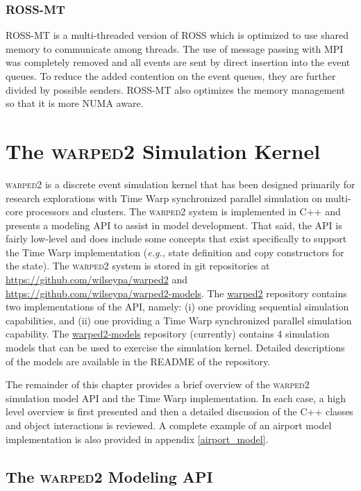 \documentclass[11pt]{book}
\begin{document}
\subsection{ROSS-MT}

ROSS-MT \cite{jagtap-12} is a multi-threaded version of ROSS which is optimized to use shared memory
to communicate among threads.  The use of message passing with MPI was completely removed and all
events are sent by direct insertion into the event queues.  To reduce the added contention on the
event queues, they are further divided by possible senders.  ROSS-MT also optimizes the memory
management so that it is more NUMA aware.



\chapter[\textsc{warped2}]{The \textsc{warped2} Simulation Kernel}\label{warped2_overview}

\textsc{warped2} is a discrete event simulation kernel that has been designed primarily for research
explorations with Time Warp synchronized parallel simulation on multi-core processors and clusters.
The \textsc{warped2} system is implemented in C++ and presents a modeling API to assist in model
development.  That said, the API is fairly low-level and does include some concepts that exist
specifically to support the Time Warp implementation (\emph{e.g.,} state definition and copy
constructors for the state).  The \textsc{warped2} system is stored in git repositories at
\url{https://github.com/wilseypa/warped2} and \url{https://github.com/wilseypa/warped2-models}.  The
\url{warped2} repository contains two implementations of the API, namely: (i) one providing
sequential simulation capabilities, and (ii) one providing a Time Warp synchronized parallel
simulation capability.  The \url{warped2-models} repository (currently) contains 4 simulation models
that can be used to exercise the simulation kernel.  Detailed descriptions of the models are
available in the README of the repository.

The remainder of this chapter provides a brief overview of the \textsc{warped2} simulation model API
and the Time Warp implementation.  In each case, a high level overview is first presented and then a
detailed discussion of the C++ classes and object interactions is reviewed.  A complete example of
an airport model implementation is also provided in appendix \ref{airport_model}.

\section{The \textsc{warped2} Modeling API}
\end{document}
